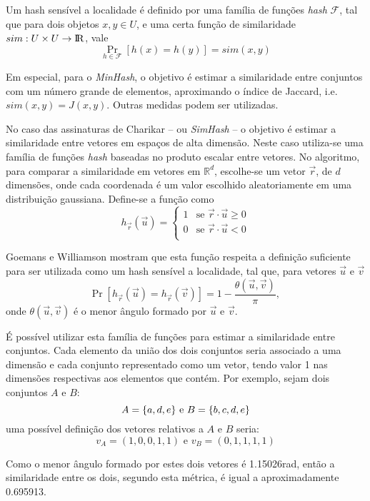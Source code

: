Um hash sensível a localidade é definido por uma família de funções \emph{hash} $\mathcal{F}$, tal que para dois objetos $x, y \in U$, e uma certa função de similaridade $sim: U \times U \to {\rm I\!R}$, vale
\[
    \Pr_{h \in \mathcal{F}}[h(x) = h(y)] = sim(x, y)
\]

Em especial, para o \emph{MinHash}, o objetivo é estimar a similaridade entre conjuntos com um número grande de elementos, aproximando o índice de Jaccard, i.e. $sim(x, y) = J(x, y)$. Outras medidas podem ser utilizadas. 

No caso das assinaturas de Charikar -- ou \emph{SimHash} -- o objetivo é estimar a similaridade entre vetores em espaços de alta dimensão. Neste caso utiliza-se uma família de funções \emph{hash} baseadas no produto escalar entre vetores. No algoritmo, para comparar a similaridade em vetores em $\mathds{R}^d$, escolhe-se um vetor $\vec{r}$, de $d$ dimensões, onde cada coordenada é um valor escolhido aleatoriamente em uma distribuição gaussiana. Define-se a função como \[
    h_{\vec{r}}(\vec{u}) = \begin{cases} 
        1 & \text{se } \vec{r} \cdot \vec{u} \geq 0 \\
        0 & \text{se } \vec{r} \cdot \vec{u} < 0 \\
    \end{cases}
\]

Goemans e Williamson \cite{goemans1995improved} mostram que esta função respeita a definição suficiente para ser utilizada como um hash sensível a localidade, tal que, para vetores $\vec{u}$ e $\vec{v}$ 
\[
    \Pr[h_{\vec{r}}(\vec{u}) = h_{\vec{r}}(\vec{v})] = 1 - \frac{\theta(\vec{u}, \vec{v})}{\pi}\text{, }
\] 
onde $\theta(\vec{u}, \vec{v})$ é o menor ângulo formado por $\vec{u}$ e $\vec{v}$.

É possível utilizar esta família de funções para estimar a similaridade entre conjuntos. Cada elemento da união dos dois conjuntos seria associado a uma dimensão e cada conjunto representado como um vetor, tendo valor 1 nas dimensões respectivas aos elementos que contém. Por exemplo, sejam dois conjuntos $A$ e $B$:
\[
    A = \{a, d, e\} \text{ e } \\
    B = \{b, c, d, e\}
\]
uma possível definição dos vetores relativos a $A$ e $B$ seria:
\[
    v_A = (1, 0, 0, 1, 1) \text{ e } 
    v_B = (0, 1, 1, 1, 1)
\]

Como o menor ângulo formado por estes dois vetores é 1.15026rad, então a similaridade entre os dois, segundo esta métrica, é igual a aproximadamente 0.695913.

